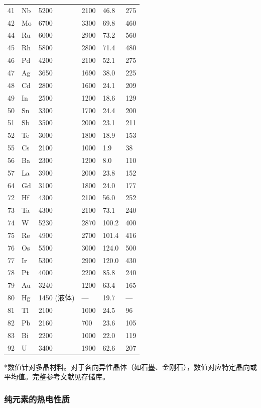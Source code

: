 \documentclass[12pt,a4paper]{article}
\begin{document}
\begin{longtable}{p{0.8cm}p{1.2cm}p{2.2cm}p{2.2cm}p{2.2cm}p{2.2cm}}
		41 & Nb & 5200 & 2100 & 46.8 & 275 \\
		42 & Mo & 6700 & 3300 & 69.8 & 460 \\
		44 & Ru & 6000 & 2900 & 73.2 & 560 \\
		45 & Rh & 5800 & 2800 & 71.4 & 480 \\
		46 & Pd & 4200 & 2100 & 52.1 & 275 \\
		47 & Ag & 3650 & 1690 & 38.0 & 225 \\
		48 & Cd & 2800 & 1600 & 24.1 & 209 \\
		49 & In & 2500 & 1200 & 18.6 & 129 \\
		50 & Sn & 3300 & 1700 & 24.4 & 200 \\
		51 & Sb & 3500 & 2000 & 23.1 & 211 \\
		52 & Te & 3000 & 1800 & 18.9 & 153 \\
		55 & Cs & 2100 & 1000 & 1.9 & 38 \\
		56 & Ba & 2300 & 1200 & 8.0 & 110 \\
		57 & La & 3900 & 2000 & 23.8 & 152 \\
		64 & Gd & 3100 & 1800 & 24.0 & 177 \\
		72 & Hf & 4300 & 2100 & 56.0 & 252 \\
		73 & Ta & 4300 & 2100 & 73.1 & 240 \\
		74 & W  & 5230 & 2870 & 100.2 & 400 \\
		75 & Re & 4900 & 2700 & 101.4 & 416 \\
		76 & Os & 5500 & 3000 & 124.0 & 500 \\
		77 & Ir & 5300 & 2900 & 120.0 & 430 \\
		78 & Pt & 4000 & 2200 & 85.8 & 240 \\
		79 & Au & 3240 & 1200 & 63.4 & 165 \\
		80 & Hg & 1450 (液体) & --- & 19.7 & --- \\
		81 & Tl & 2100 & 1000 & 24.5 & 96 \\
		82 & Pb & 2160 & 700 & 23.6 & 105 \\
		83 & Bi & 2200 & 1000 & 22.0 & 119 \\
		92 & U  & 3400 & 1900 & 62.6 & 207 \\
		\bottomrule
	\end{longtable}
	*数值针对多晶材料。对于各向异性晶体（如石墨、金刚石），数值对应特定晶向或平均值。完整参考文献见存储库。
	
	\subsubsection{纯元素的热电性质}
	\label{subsec:thermoelectric-properties-func}
	
\end{document}
